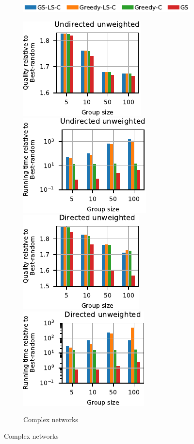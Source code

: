 \begin{figure}[tb]
\begin{subfigure}[t]{\textwidth}
\centering
\includegraphics{./sources/plots/gh-gc-apx/legend-quality-closeness.pdf}
\end{subfigure}\medskip

\begin{subfigure}[t]{\textwidth}
\centering
\includegraphics[width=.24\textwidth]{./sources/plots/gh-gc-apx/quality-small-diameter-undirected-unweighted.pdf}
\includegraphics[width=.24\textwidth]{./sources/plots/gh-gc-apx/time-small-diameter-undirected-unweighted.pdf}
\includegraphics[width=.24\textwidth]{./sources/plots/gh-gc-apx/quality-small-diameter-directed-unweighted.pdf}
\includegraphics[width=.24\textwidth]{./sources/plots/gh-gc-apx/time-small-diameter-directed-unweighted.pdf}
\caption{Complex networks}
\label{fig:gh-gc-apx:qual-time-gc-cplx}
\end{subfigure}\medskip


\end{figure}
